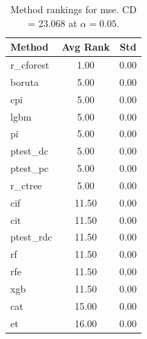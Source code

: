 \begin{table}[h]
\centering
\caption{Method rankings for mse. CD = 23.068 at $\alpha=0.05$.}
\label{tab:ranks_mse}
\begin{tabular}{lcc}
\toprule
Method & Avg Rank & Std \\
\midrule
r_cforest & 1.00 & 0.00 \\
boruta & 5.00 & 0.00 \\
cpi & 5.00 & 0.00 \\
lgbm & 5.00 & 0.00 \\
pi & 5.00 & 0.00 \\
ptest_dc & 5.00 & 0.00 \\
ptest_pc & 5.00 & 0.00 \\
r_ctree & 5.00 & 0.00 \\
cif & 11.50 & 0.00 \\
cit & 11.50 & 0.00 \\
ptest_rdc & 11.50 & 0.00 \\
rf & 11.50 & 0.00 \\
rfe & 11.50 & 0.00 \\
xgb & 11.50 & 0.00 \\
cat & 15.00 & 0.00 \\
et & 16.00 & 0.00 \\
\bottomrule
\end{tabular}
\end{table}